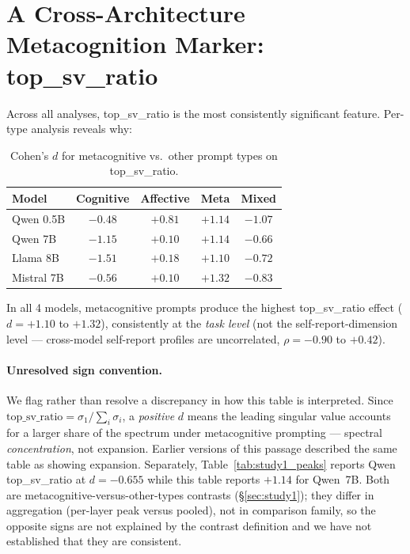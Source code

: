 \documentclass[11pt,a4paper]{article}
\begin{document}
\section{A Cross-Architecture Metacognition Marker: top\_sv\_ratio}
\label{sec:tsv}

Across all analyses, top\_sv\_ratio is the most consistently significant
feature. Per-type analysis reveals why:

\begin{table}[H]
\centering
\caption{Cohen's $d$ for metacognitive vs.\ other prompt types on top\_sv\_ratio.}
\label{tab:tsv_universal}
\begin{tabular}{lcccc}
\toprule
\textbf{Model} & \textbf{Cognitive} & \textbf{Affective} & \textbf{Meta} & \textbf{Mixed} \\
\midrule
Qwen 0.5B  & $-0.48$ & $+0.81$ & $+1.14$ & $-1.07$ \\
Qwen 7B    & $-1.15$ & $+0.10$ & $+1.14$ & $-0.66$ \\
Llama 8B   & $-1.51$ & $+0.18$ & $+1.10$ & $-0.72$ \\
Mistral 7B & $-0.56$ & $+0.10$ & $+1.32$ & $-0.83$ \\
\bottomrule
\end{tabular}
\end{table}

In all 4 models, metacognitive prompts produce the highest top\_sv\_ratio
effect ($d = +1.10$ to $+1.32$), consistently at the \emph{task level}
(not the self-report-dimension level --- cross-model self-report profiles
are uncorrelated, $\rho = -0.90$ to $+0.42$).

\paragraph{Unresolved sign convention.} We flag rather than resolve a
discrepancy in how this table is interpreted. Since
$\text{top\_sv\_ratio} = \sigma_1 / \sum_i \sigma_i$, a \emph{positive}
$d$ means the leading singular value accounts for a larger share of the
spectrum under metacognitive prompting --- spectral \emph{concentration},
not expansion. Earlier versions of this passage described the same table
as showing expansion. Separately, Table~\ref{tab:study1_peaks} reports
Qwen top\_sv\_ratio at $d = -0.655$ while this table reports $+1.14$ for
Qwen~7B. Both are metacognitive-versus-other-types contrasts
(\S\ref{sec:study1}); they differ in aggregation (per-layer peak versus
pooled), not in comparison family, so the opposite signs are not explained
by the contrast definition and we have not established that they are
consistent.
\end{document}
